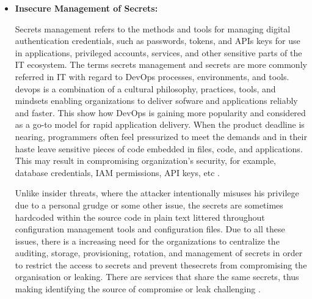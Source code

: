\begin{itemize}
    \item \textbf{Insecure Management of Secrets:} \par Secrets management refers to the methods and tools for managing digital authentication credentials, such as passwords, tokens, and APIs keys for use in applications, privileged accounts, services, and other sensitive parts of the IT ecosystem.
    The terms secrets management and secrets are more commonly referred in IT with regard to DevOps processes, environments, and tools.
    \gls{devops} is a combination of a cultural philosophy,
    practices, tools, and mindsets enabling organizations to deliver sofware and applications reliably and faster.
    This show how DevOps is gaining more popularity and considered as a go-to model for rapid application delivery.
    When the product deadline is nearing, programmers often feel pressurized to meet the demands and in their haste leave sensitive pieces of code embedded in files, code, and applications. This may result in compromising organization’s security, for example, database credentials, IAM permissions, API keys, etc \cite{61}.

    Unlike insider threats, where the attacker intentionally misuses his privilege due to a personal grudge or some
    other issue, the secrets are sometimes hardcoded
    within the source code in plain text littered throughout configuration management tools and configuration files.
    Due to all these issues, there is a increasing  need for the organizations to centralize the auditing, storage, provisioning, rotation, and management of secrets in order to restrict the access to secrets and prevent thesecrets from compromising the organisation or leaking. There are services that share the same secrets, thus making identifying the source of compromise or leak challenging \cite{62}.
\end{itemize}


